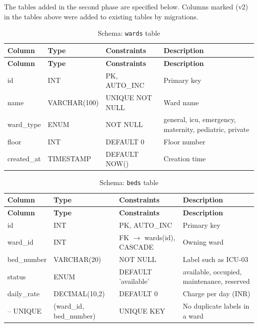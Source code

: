 The tables added in the second phase are specified below. Columns marked (v2) in the tables above were added to existing tables by migrations.

\begin{longtable}{|L{3.3cm}|L{2.5cm}|L{2.4cm}|L{4.6cm}|}
\caption{Schema: \texttt{wards} table} \label{tab:wards} \\
\hline
\textbf{Column} & \textbf{Type} & \textbf{Constraints} & \textbf{Description} \\
\hline
\endfirsthead
\hline
\textbf{Column} & \textbf{Type} & \textbf{Constraints} & \textbf{Description} \\
\hline
\endhead
\hline
\endfoot
id & INT & PK, AUTO\_INC & Primary key \\
\hline
name & VARCHAR(100) & UNIQUE NOT NULL & Ward name \\
\hline
ward\_type & ENUM & NOT NULL & general, icu, emergency, maternity, pediatric, private \\
\hline
floor & INT & DEFAULT 0 & Floor number \\
\hline
created\_at & TIMESTAMP & DEFAULT NOW() & Creation time \\
\hline
\end{longtable}
\begin{longtable}{|L{3.3cm}|L{2.5cm}|L{2.4cm}|L{4.6cm}|}
\caption{Schema: \texttt{beds} table} \label{tab:beds} \\
\hline
\textbf{Column} & \textbf{Type} & \textbf{Constraints} & \textbf{Description} \\
\hline
\endfirsthead
\hline
\textbf{Column} & \textbf{Type} & \textbf{Constraints} & \textbf{Description} \\
\hline
\endhead
\hline
\endfoot
id & INT & PK, AUTO\_INC & Primary key \\
\hline
ward\_id & INT & FK $\rightarrow$ wards(id), CASCADE & Owning ward \\
\hline
bed\_number & VARCHAR(20) & NOT NULL & Label such as ICU-03 \\
\hline
status & ENUM & DEFAULT 'available' & available, occupied, maintenance, reserved \\
\hline
daily\_rate & DECIMAL(10,2) & DEFAULT 0 & Charge per day (INR) \\
\hline
-- UNIQUE & (ward\_id, bed\_number) & UNIQUE KEY & No duplicate labels in a ward \\
\hline
\end{longtable}
